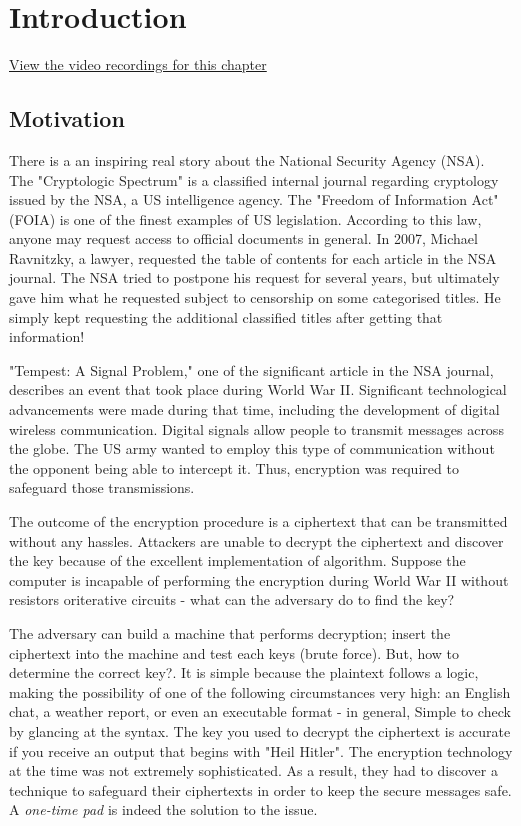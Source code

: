 \chapter{Introduction} \label{chap:c1_IntroductionAOI}

\href{https://orenlab.sise.bgu.ac.il/AttacksonImplementationsCourseBook/#lecture-1---introduction}{View the video recordings for this chapter}

\section{Motivation} \label{sec:Motivation} %

There is a an inspiring real story about the National Security Agency (NSA). 
The "Cryptologic Spectrum" is a classified internal journal regarding cryptology issued by the NSA, a US intelligence agency.
The "Freedom of Information Act" (FOIA) is one of the finest examples of US legislation. According to this law, 
anyone may request access to official documents in general.
In 2007, Michael Ravnitzky, a lawyer, requested the table of contents for each article in the NSA journal. 
The NSA tried to postpone his request for several years,
but ultimately gave him what he requested subject to censorship on some categorised titles.
He simply kept requesting the additional classified titles after getting that information!

"Tempest: A Signal Problem," one of the significant article in the NSA journal, describes an event that took place during World War II.
Significant technological advancements were made during that time, including the development of digital wireless communication.
Digital signals allow people to transmit messages across the globe. The US army wanted to employ this type of 
communication without the opponent being able to intercept it. Thus, encryption was required to safeguard those transmissions.

The outcome of the encryption procedure is a ciphertext that can be transmitted without any hassles. 
Attackers are unable to decrypt the ciphertext and discover the key because of the excellent implementation of algorithm.
Suppose the computer is incapable of performing the encryption during World War II without resistors oriterative circuits 
- what can the adversary do to find the key?

The adversary can build a machine that performs decryption; insert the ciphertext into the machine and test each keys (brute force). 
But, how to determine the correct key?. It is simple because the plaintext follows a logic, making the possibility of 
one of the following circumstances very high:  an English chat, a weather report, or 
even an executable format - in general, Simple to check by glancing at the syntax.
The key you used to decrypt the ciphertext is accurate if you receive an output that begins with "Heil Hitler". 
The encryption technology at the time was not extremely sophisticated. As a result, they had to discover a technique 
to safeguard their ciphertexts in order to keep the secure messages safe. A \textit{one-time pad} is indeed the solution to the issue.

